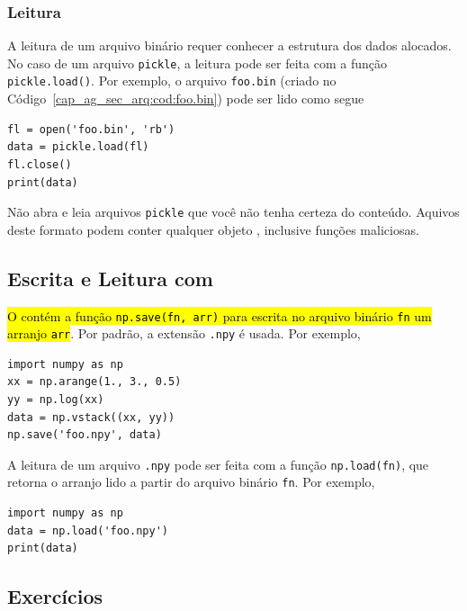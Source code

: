 \subsubsection{Leitura}

A leitura de um arquivo binário requer conhecer a estrutura dos dados alocados. No caso de um arquivo \lstinline+pickle+, a leitura pode ser feita com a função \lstinline+pickle.load()+. Por exemplo, o arquivo \lstinline+foo.bin+ (criado no Código~\ref{cap_ag_sec_arq:cod:foo.bin}) pode ser lido como segue
\begin{lstlisting}
fl = open('foo.bin', 'rb')
data = pickle.load(fl)
fl.close()
print(data)
\end{lstlisting}

\begin{obs}
  Não abra e leia arquivos \lstinline+pickle+ que você não tenha certeza do conteúdo. Aquivos deste formato podem conter qualquer objeto {\python}, inclusive funções maliciosas.
\end{obs}

\subsection{Escrita e Leitura com {\numpy}}

\hl{O {\numpy} contém a função {\lstinline+np.save(fn, arr)+} para escrita no arquivo binário {\lstinline+fn+} um arranjo {\lstinline+arr+}}. Por padrão, a extensão \lstinline+.npy+ é usada. Por exemplo,
\begin{lstlisting}
import numpy as np
xx = np.arange(1., 3., 0.5)
yy = np.log(xx)
data = np.vstack((xx, yy))
np.save('foo.npy', data)
\end{lstlisting}

A leitura de um arquivo \lstinline+.npy+ pode ser feita com a função \lstinline+np.load(fn)+, que retorna o arranjo lido a partir do arquivo binário \lstinline+fn+. Por exemplo,
\begin{lstlisting}
import numpy as np
data = np.load('foo.npy')
print(data)
\end{lstlisting}

\subsection{Exercícios}


